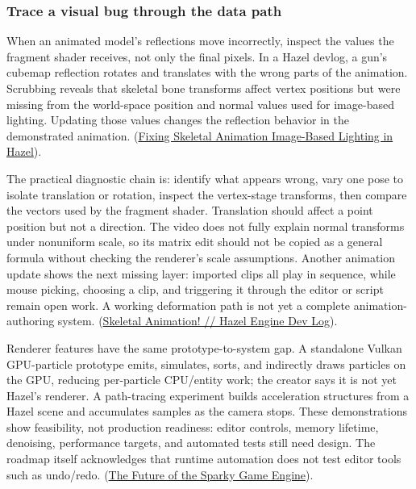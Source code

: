 \subsubsection{Trace a visual bug through the data path}\label{06-engine-ii-ch041-trace-a-visual-bug-through-the-data-path}

\hypertarget{06-engine-ii-ch041-trace-a-visual-bug-through-the-data-path}{}

When an animated model's reflections move incorrectly, inspect the values the fragment shader receives, not only the final pixels. In a Hazel devlog, a gun's cubemap reflection rotates and translates with the wrong parts of the animation. Scrubbing reveals that skeletal bone transforms affect vertex positions but were missing from the world-space position and normal values used for image-based lighting. Updating those values changes the reflection behavior in the demonstrated animation. (\href{https://www.youtube.com/watch?v=fs9ChRr4VHM&t=4m18s}{Fixing Skeletal Animation Image-Based Lighting in Hazel}).

The practical diagnostic chain is: identify what appears wrong, vary one pose to isolate translation or rotation, inspect the vertex-stage transforms, then compare the vectors used by the fragment shader. Translation should affect a point position but not a direction. The video does not fully explain normal transforms under nonuniform scale, so its matrix edit should not be copied as a general formula without checking the renderer's scale assumptions. Another animation update shows the next missing layer: imported clips all play in sequence, while mouse picking, choosing a clip, and triggering it through the editor or script remain open work. A working deformation path is not yet a complete animation-authoring system. (\href{https://www.youtube.com/watch?v=8-wAi--vW1o&t=4m18s}{Skeletal Animation! // Hazel Engine Dev Log}).

Renderer features have the same prototype-to-system gap. A standalone Vulkan GPU-particle prototype emits, simulates, sorts, and indirectly draws particles on the GPU, reducing per-particle CPU/entity work; the creator says it is not yet Hazel's renderer. A path-tracing experiment builds acceleration structures from a Hazel scene and accumulates samples as the camera stops. These demonstrations show feasibility, not production readiness: editor controls, memory lifetime, denoising, performance targets, and automated tests still need design. The roadmap itself acknowledges that runtime automation does not test editor tools such as undo/redo. (\href{https://www.youtube.com/watch?v=hUFHzuIyK0g&t=6m27s}{The Future of the Sparky Game Engine}).

